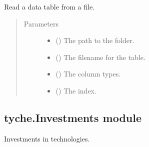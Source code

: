 \documentclass[letterpaper,10pt,english]{sphinxmanual}
\begin{document}

\begin{fulllineitems}
\label{\detokenize{tyche:tyche.IO.read_table}}
Read a data table from a file.
\begin{quote}\begin{description}
\item[{Parameters}] \leavevmode\begin{itemize}
\item {} 
 () \textendash{} The path to the folder.

\item {} 
 () \textendash{} The filename for the table.

\item {} 
 () \textendash{} The column types.

\item {} 
 () \textendash{} The index.

\end{itemize}

\end{description}\end{quote}

\end{fulllineitems}



\subsection{tyche.Investments module}
\label{\detokenize{tyche:module-tyche.Investments}}\label{\detokenize{tyche:tyche-investments-module}}
Investments in technologies.
\end{document}

